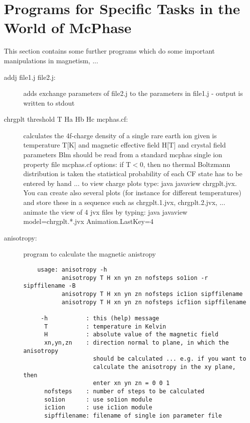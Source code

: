 \section{Programs for Specific Tasks in the World of McPhase}\label{addprog}

This section  contains some further programs which do some important manipulations
in magnetism, ...

\begin{description} 

\item [\prg addj file1.j file2.j:] adds exchange parameters of file2.j to the %
parameters in
file1.j - output is written to stdout

\item [\prg chrgplt threshold T Ha Hb Hc mcphas.cf:]
                calculates  the 4f-charge density of a single rare earth ion
                given is temperature T[K] and magnetic effective field H[T]
 		and crystal field  parameters Blm should be read from a 
	        standard mcphas single ion property file mcphas.cf 
                options: if T$<$0, then no thermal Boltzmann distribution
		 is taken
		the statistical probability of each CF state has to be 
		entered by hand ... to view charge plots type: java javaview chrgplt.jvx.
		You can create also several plots (for instance for different temperatures) and store %
these
		in a sequence such as chrgplt.1.jvx, chrgplt.2.jvx, ... animate
		the view of 4 jvx files by typing: java javaview model=chrgplt.*.jvx Animation.LastKey=4 
\item [\prg anisotropy:] program to calculate the magnetic anistropy
\begin{verbatim}
    usage: anisotropy -h 
           anisotropy T H xn yn zn nofsteps so1ion -r sipffilename -B
           anisotropy T H xn yn zn nofsteps ic1ion sipffilename
           anisotropy T H xn yn zn nofsteps icf1ion sipffilename

     -h           : this (help) message
      T           : temperature in Kelvin
      H           : absolute value of the magnetic field
      xn,yn,zn    : direction normal to plane, in which the anisotropy
                    should be calculated ... e.g. if you want to
                    calculate the anisotropy in the xy plane, then
                    enter xn yn zn = 0 0 1
      nofsteps    : number of steps to be calculated 
      so1ion      : use so1ion module
      ic1ion      : use ic1ion module
      sipffilename: filename of single ion parameter file


\end{verbatim}
\end{description}
